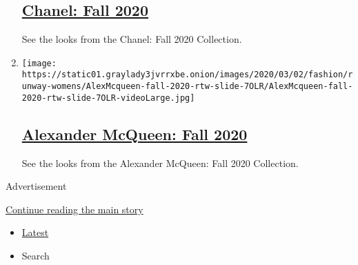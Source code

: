\begin{enumerate}
  \hypertarget{chanel-fall-2020}{%
  \subsection{\texorpdfstring{\href{/slideshow/2020/03/03/fashion/runway-womens/chanel-fall-2020.html}{Chanel:
  Fall 2020}}{Chanel: Fall 2020}}\label{chanel-fall-2020}}

  See the looks from the Chanel: Fall 2020 Collection.
\item
  \texttt{[image: https://static01.graylady3jvrrxbe.onion/images/2020/03/02/fashion/runway-womens/AlexMcqueen-fall-2020-rtw-slide-7OLR/AlexMcqueen-fall-2020-rtw-slide-7OLR-videoLarge.jpg]}

  \hypertarget{alexander-mcqueen-fall-2020}{%
  \subsection{\texorpdfstring{\href{/slideshow/2020/03/02/fashion/runway-womens/alexander-mcqueen-fall-2020.html}{Alexander
  McQueen: Fall
  2020}}{Alexander McQueen: Fall 2020}}\label{alexander-mcqueen-fall-2020}}

  See the looks from the Alexander McQueen: Fall 2020 Collection.
\end{enumerate}

Advertisement

\protect\hyperlink{after-mid7}{Continue reading the main story}

\begin{itemize}
\tightlist
\item
  \protect\hyperlink{stream-panel}{Latest}
\item
  Search
\end{itemize}

